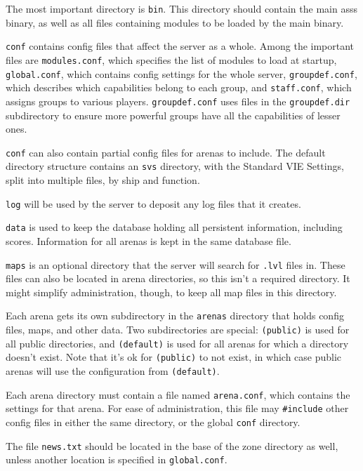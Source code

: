 \documentclass{article}
\newcommand{\asss}{asss}
\begin{document}
The most important directory is \verb/bin/. This directory should
contain the main \asss{} binary, as well as all files containing modules
to be loaded by the main binary.

\verb/conf/ contains config files that affect the server as a whole.
Among the important files are \verb/modules.conf/, which specifies the
list of modules to load at startup, \verb/global.conf/, which contains
config settings for the whole server, \verb/groupdef.conf/, which
describes which capabilities belong to each group, and
\verb/staff.conf/, which assigns groups to various players.
\verb/groupdef.conf/ uses files in the \verb/groupdef.dir/ subdirectory
to ensure more powerful groups have all the capabilities of lesser ones.

\verb/conf/ can also contain partial config files for arenas to include.
The default directory structure contains an \verb/svs/ directory, with
the Standard VIE Settings, split into multiple files, by ship and
function.

\verb/log/ will be used by the server to deposit any log files that it
creates.

\verb/data/ is used to keep the database holding all persistent
information, including scores. Information for all arenas is kept in the
same database file.

\verb/maps/ is an optional directory that the server will search for
\verb/.lvl/ files in. These files can also be located in arena
directories, so this isn't a required directory. It might simplify
administration, though, to keep all map files in this directory.

Each arena gets its own subdirectory in the \verb/arenas/ directory that
holds config files, maps, and other data. Two subdirectories are
special: \verb/(public)/ is used for all public directories, and
\verb/(default)/ is used for all arenas for which a directory doesn't
exist. Note that it's ok for \verb/(public)/ to not exist, in which case
public arenas will use the configuration from \verb/(default)/.

Each arena directory must contain a file named \verb/arena.conf/, which
contains the settings for that arena. For ease of administration, this
file may \verb/#include/ other config files in either the same
directory, or the global \verb/conf/ directory.

The file \verb/news.txt/ should be located in the base of the zone
directory as well, unless another location is specified in
\verb/global.conf/.
\end{document}
